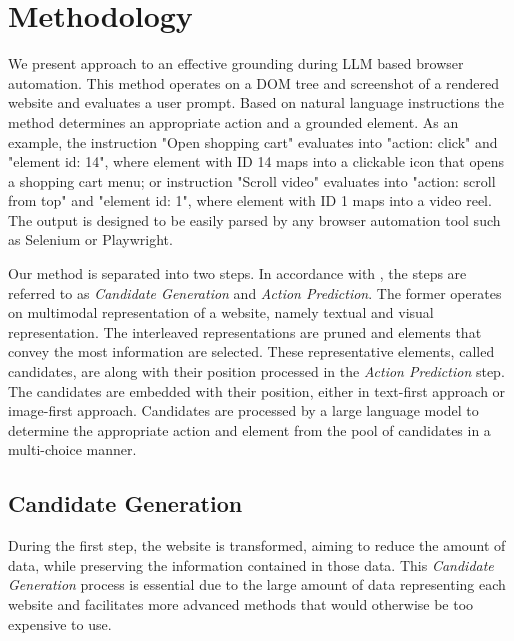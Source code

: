 \chapter{Methodology}\label{chap:method}
We present approach to an effective grounding during LLM based browser automation. This method operates on a DOM tree and screenshot of a rendered website and evaluates a user prompt. Based on natural language instructions the method determines an appropriate action and a grounded element. As an example, the instruction "Open shopping cart" evaluates into "action: click" and "element id: 14", where element with ID 14 maps into a clickable icon that opens a shopping cart menu; or instruction "Scroll video" evaluates into "action: scroll from top" and "element id: 1", where element with ID 1 maps into a video reel. The output is designed to be easily parsed by any browser automation tool such as Selenium or Playwright.

Our method is separated into two steps. In accordance with \textcite{deng_mind2web_2023}, the steps are referred to as \textit{Candidate Generation} and \textit{Action Prediction}. The former operates on multimodal representation of a website, namely textual and visual representation. The interleaved representations are pruned and elements that convey the most information are selected. These representative elements, called candidates, are along with their position processed in the \textit{Action Prediction} step. The candidates are embedded with their position, either in text-first approach or image-first approach. Candidates are processed by a large language model to determine the appropriate action and element from the pool of candidates in a multi-choice manner.

\section{Candidate Generation}\label{section:candidategen}
During the first step, the website is transformed, aiming to reduce the amount of data, while preserving the information contained in those data. This \textit{Candidate Generation} process is essential due to the large amount of data representing each website and facilitates more advanced methods that would otherwise be too expensive to use.


